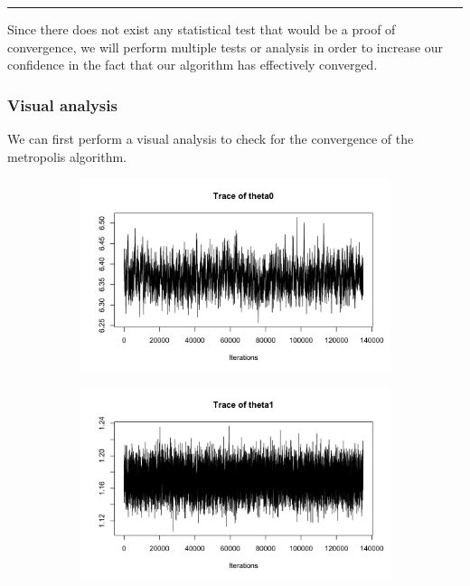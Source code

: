 \begin{center}\rule{6cm}{0.4pt}\end{center}

Since there does not exist any statistical test that would be a proof of convergence, we will perform multiple tests or analysis in order to increase our confidence in the fact that our algorithm has effectively converged.

\subsubsection*{Visual analysis}

We can first perform a visual analysis to check for the convergence of the metropolis algorithm.

\begin{figure}[H]
	\centering
	\begin{subfigure}{0.3\textwidth}
		\centering
		\includegraphics{figures/metropolis_cw/metropolis_cw_traceplot_theta0}
	\end{subfigure}
	\begin{subfigure}{0.3\textwidth}
		\centering
		\includegraphics{figures/metropolis_cw/metropolis_cw_traceplot_theta1}

\end{subfigure}
\end{figure}

